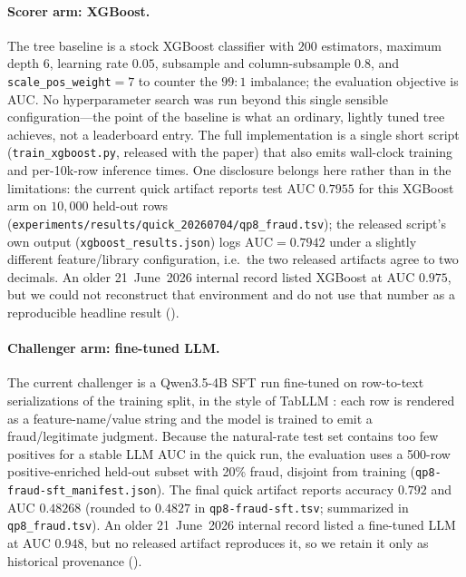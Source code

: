 \paragraph{Scorer arm: XGBoost.}
The tree baseline is a stock XGBoost classifier \citep{chen2016xgboost} with
$200$ estimators, maximum depth $6$, learning rate $0.05$, subsample and
column-subsample $0.8$, and \texttt{scale\_pos\_weight}$=7$ to counter the
$99{:}1$ imbalance; the evaluation objective is AUC. No hyperparameter search
was run beyond this single sensible configuration---the point of the baseline
is what an ordinary, lightly tuned tree achieves, not a leaderboard entry. The
full implementation is a single short script (\texttt{train\_xgboost.py},
released with the paper) that also emits wall-clock training and per-10k-row
inference times. One disclosure belongs here rather than in the limitations:
the current quick artifact reports test AUC $0.7955$ for this XGBoost arm
on $10{,}000$ held-out rows
(\texttt{experiments/results/quick\_20260704/qp8\_fraud.tsv}); the released
script's own output (\texttt{xgboost\_results.json}) logs
$\mathrm{AUC}{=}0.7942$ under a slightly different feature/library
configuration, i.e.\ the two released artifacts agree to two decimals. An older
21~June~2026 internal record listed XGBoost at AUC $0.975$, but we could not
reconstruct that environment and do not use that number as a reproducible
headline result ().

\paragraph{Challenger arm: fine-tuned LLM.}
The current challenger is a Qwen3.5-4B SFT run fine-tuned on row-to-text
serializations of the training split, in the style of TabLLM
\citep{hegselmann2023tabllm}: each row is rendered as a feature-name/value
string and the model is trained to emit a fraud/legitimate judgment. Because
the natural-rate test set contains too few positives for a stable LLM AUC in
the quick run, the evaluation uses a 500-row positive-enriched held-out subset
with 20\% fraud, disjoint from training
(\texttt{qp8-fraud-sft\_manifest.json}). The final quick artifact reports
accuracy $0.792$ and AUC $0.48268$ (rounded to $0.4827$ in
\texttt{qp8-fraud-sft.tsv}; summarized in \texttt{qp8\_fraud.tsv}). An older
21~June~2026 internal record listed a fine-tuned LLM at AUC $0.948$, but no
released artifact reproduces it, so we retain it only as historical provenance
().


